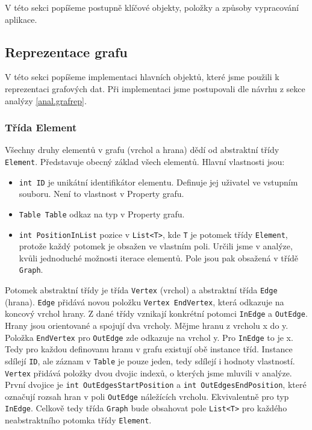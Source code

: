 V této sekci popíšeme postupně klíčové objekty, položky a způsoby vypracování aplikace.  

\subsection{Reprezentace grafu}

V této sekci popíšeme implementaci hlavních objektů, které jsme použili k reprezentaci grafových dat.
Při implementaci jsme postupovali dle návrhu z sekce analýzy \ref{anal.grafrep}.

\subsubsection{Třída Element}

Všechny druhy elementů v grafu (vrchol a hrana) dědí od abstraktní třídy \texttt{Element}.
Představuje obecný základ všech elementů.
Hlavní vlastnosti jsou:
\begin{itemize}
\item \texttt{int ID} je unikátní identifikátor elementu. Definuje jej uživatel ve vstupním souboru. Není to vlastnost v Property grafu.
\item \texttt{Table Table} odkaz na typ v Property grafu.
\item \texttt{int PositionInList} pozice v \texttt{List<T>}, kde \texttt{T} je potomek třídy \texttt{Element}, protože každý potomek je obsažen ve vlastním poli.
Určili jsme v analýze, kvůli jednoduché možnosti iterace elementů.
Pole jsou pak obsažená v třídě \texttt{Graph}.
\end{itemize}

Potomek abstraktní třídy je třída \texttt{Vertex} (vrchol) a abstraktní třída \texttt{Edge} (hrana).
\texttt{Edge} přidává novou položku \texttt{Vertex EndVertex}, která odkazuje na koncový vrchol hrany.
Z dané třídy vznikají konkrétní potomci \texttt{InEdge} a \texttt{OutEdge}.
Hrany jsou orientované a spojují dva vrcholy.
Mějme hranu z vrcholu x do y.
Položka \texttt{EndVertex} pro \texttt{OutEdge} zde odkazuje na vrchol y.
Pro \texttt{InEdge} to je x.
Tedy pro každou definovanu hranu v grafu existují obě instance tříd. 
Instance sdílejí \texttt{ID}, ale záznam v \texttt{Table} je pouze jeden, tedy sdílejí i hodnoty vlastností. 
\texttt{Vertex} přidává položky dvou dvojic indexů, o kterých jsme mluvili v analýze.
První dvojice je \texttt{int OutEdgesStartPosition} a \texttt{int OutEdgesEndPosition}, které označují rozsah hran v poli \texttt{OutEdge} náležících vrcholu.
Ekvivalentně pro typ \texttt{InEdge}.
Celkově tedy třída \texttt{Graph} bude obsahovat pole \texttt{List<T>} pro každého neabstraktního potomka třídy \texttt{Element}.

